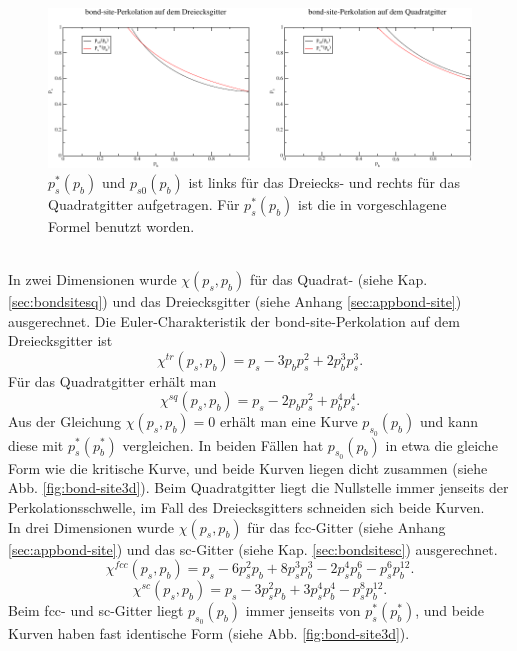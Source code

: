 \begin{figure}[tbp]
  \centering
  \includegraphics{./Schranken-figs/bond-site2d}
  \caption{$p_s^*(p_b)$ und $p_{s0}(p_b)$ ist links f\"ur das Dreiecks- und rechts f\"ur das Quadratgitter aufgetragen. F\"ur $p_s^*(p_b)$ ist die in \cite{Yanuka:90} vorgeschlagene Formel benutzt worden.}
  \label{fig:bond-site2d}
\end{figure}
\\In zwei Dimensionen wurde $\chi(p_s,p_b)$ f\"ur das Quadrat- (siehe Kap. \ref{sec:bondsitesq}) und das Dreiecksgitter (siehe Anhang \ref{sec:appbond-site}) ausgerechnet. Die Euler-Charakteristik der bond-site-Perkolation auf dem Dreiecksgitter ist
\begin{equation}
\chi^{tr}(p_s,p_b)=p_s-3p_bp_s^2+2p_b^3p_s^3.
\end{equation}
F\"ur das Quadratgitter erh\"alt man
\begin{equation}
\chi^{sq}(p_s,p_b)=p_s-2p_bp_s^2+p_b^4p_s^4.
\end{equation}
Aus der Gleichung $\chi(p_s,p_b)=0$ erh\"alt man eine Kurve $p_{s_0}(p_b)$ und kann diese mit $p^*_s\left(p^*_b\right)$ vergleichen. In beiden F\"allen hat $p_{s_0}(p_b)$ in etwa die gleiche Form wie die kritische Kurve, und beide Kurven liegen dicht zusammen (siehe Abb. \ref{fig:bond-site3d}). Beim Quadratgitter liegt die Nullstelle immer jenseits der Perkolationsschwelle, im Fall des Dreiecksgitters schneiden sich beide Kurven.
\\In drei Dimensionen wurde $\chi(p_s,p_b)$ f\"ur das fcc-Gitter (siehe Anhang \ref{sec:appbond-site}) und das sc-Gitter (siehe Kap. \ref{sec:bondsitesc}) ausgerechnet. 
\begin{equation}
 \chi^{fcc}(p_s,p_b)=p_s-6p_s^2p_b+8p_s^3p_b^3-2p_s^4p_b^6-p_s^6p_b^{12}.
\end{equation}
\begin{equation}
\chi^{sc}(p_s,p_b)= p_s-3p_s^2p_b+3p_s^4p_b^4-p_s^8p_b^{12}.
\end{equation}
Beim fcc- und sc-Gitter liegt $p_{s_0}(p_b)$ immer jenseits von $p_s^*(p_b^*)$, und beide Kurven haben fast identische Form (siehe Abb. \ref{fig:bond-site3d}).
\\

